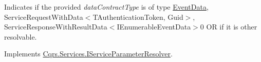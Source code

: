 Indicates if the provided {\itshape data\+Contract\+Type}  is of type \hyperlink{classCqrs_1_1Events_1_1EventData}{Event\+Data}, Service\+Request\+With\+Data$<$\+T\+Authentication\+Token, Guid$>$, Service\+Response\+With\+Result\+Data$<$\+I\+Enumerable\+Event\+Data$>$0 OR if it is other resolvable. 



Implements \hyperlink{interfaceCqrs_1_1Services_1_1IServiceParameterResolver_a31c82a00b192b877faff6df99e1b689b_a31c82a00b192b877faff6df99e1b689b}{Cqrs.\+Services.\+I\+Service\+Parameter\+Resolver}.


